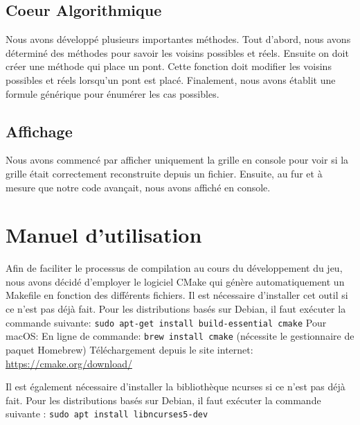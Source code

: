 \documentclass{article}
\begin{document}
    \subsection{\Large Coeur Algorithmique}
    \hspace{0.5cm} Nous avons développé plusieurs importantes méthodes. Tout d'abord, nous avons déterminé des méthodes pour savoir les voisins possibles et réels. Ensuite on doit créer une méthode qui place un pont. Cette fonction doit modifier les voisins possibles et réels lorsqu'un pont est placé.
    Finalement, nous avons établit une formule générique pour énumérer les cas possibles.

    \subsection{\Large Affichage}
    \hspace{0.5cm} Nous avons commencé par afficher uniquement la grille en console pour voir si la grille était correctement reconstruite depuis un fichier. Ensuite, au fur et à mesure que notre code avançait, nous avons affiché en console.

\section{\LARGE Manuel d'utilisation}

\hspace{0.5cm} Afin de faciliter le processus de compilation au cours du développement du jeu, nous avons décidé d'employer le logiciel CMake qui génère automatiquement un Makefile en fonction des différents fichiers. Il est nécessaire d'installer cet outil si ce n'est pas déjà fait. \newline
Pour les distributions basés sur Debian, il faut exécuter la commande suivante: \newline
\noindent \texttt{sudo apt-get install build-essential cmake}
\newline
Pour macOS: \newline
En ligne de commande: \newline
\texttt{brew install cmake} (nécessite le gestionnaire de paquet Homebrew) \newline
Téléchargement depuis le site internet: \newline
\url{https://cmake.org/download/} \newline


Il est également nécessaire d'installer la bibliothèque ncurses si ce n'est pas déjà fait.
Pour les distributions basés sur Debian, il faut exécuter la commande suivante : \newline
\noindent \texttt{sudo apt install libncurses5-dev}
\end{document}
